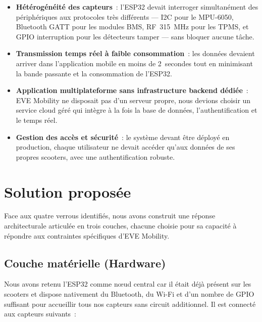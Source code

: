 \documentclass[12pt, a4paper]{report}
\begin{document}
\begin{itemize}
  \item \textbf{Hétérogénéité des capteurs}~: l'ESP32 devait interroger simultanément
        des périphériques aux protocoles très différents --- I2C pour le MPU-6050,
        Bluetooth GATT pour les modules BMS, RF~315~MHz pour les TPMS, et GPIO
        interruption pour les détecteurs tamper --- sans bloquer aucune tâche.
  \item \textbf{Transmission temps réel à faible consommation}~: les données devaient
        arriver dans l'application mobile en moins de 2~secondes tout en minimisant
        la bande passante et la consommation de l'ESP32.
  \item \textbf{Application multiplateforme sans infrastructure backend dédiée}~: EVE
        Mobility ne disposait pas d'un serveur propre, nous devions choisir un service
        cloud géré qui intègre à la fois la base de données, l'authentification et le
        temps réel.
  \item \textbf{Gestion des accès et sécurité}~: le système devant être déployé en
        production, chaque utilisateur ne devait accéder qu'aux données de ses propres
        scooters, avec une authentification robuste.
\end{itemize}

\section{Solution proposée}

Face aux quatre verrous identifiés, nous avons construit une réponse architecturale
articulée en trois couches, chacune choisie pour sa capacité à répondre aux contraintes
spécifiques d'EVE Mobility.

\subsection{Couche matérielle (Hardware)}

Nous avons retenu l'ESP32 comme nœud central car il était déjà présent sur les scooters
et dispose nativement du Bluetooth, du Wi-Fi et d'un nombre de GPIO suffisant pour
accueillir tous nos capteurs sans circuit additionnel. Il est connecté aux capteurs
suivants~:
\end{document}
